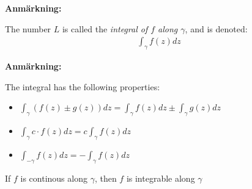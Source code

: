 \par\bigskip
\noindent\textbf{Anmärkning:}\par
\noindent The number $L$ is called the \textit{integral of $f$ along $\gamma$}, and is denoted:
\begin{equation*}
  \begin{gathered}
    \int_{\gamma}f(z)dz
  \end{gathered}
\end{equation*}
\par\bigskip
\noindent\textbf{Anmärkning:}\par
\noindent The integral has the following properties:
\par\bigskip
\begin{itemize}
  \item $\int_{\gamma}(f(z)\pm g(z))dz = \int_{\gamma}f(z)dz\pm\int_{\gamma}g(z)dz$
    \par\bigskip
  \item $\int_{\gamma}c\cdot f(z)dz = c\int_{\gamma}f(z)dz$
    \par\bigskip
  \item $\int_{-\gamma}f(z)dz = -\int_{\gamma}f(z)dz$
\end{itemize}
\newpage
\begin{theo}[]{}
  If $f$ is continous along $\gamma$, then $f$ is integrable along $\gamma$
\end{theo}
\par\bigskip
